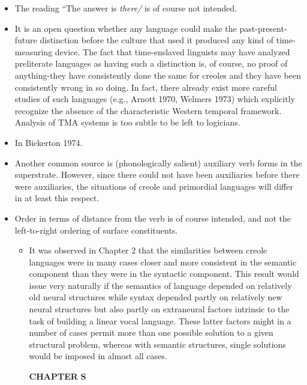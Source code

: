 \begin{itemize}
\begin{itemize}
\begin{itemize}
\begin{itemize}
\begin{itemize}
\begin{itemize}
\begin{itemize}
\begin{itemize}
\begin{itemize}
\begin{itemize}
\begin{itemize}
\begin{itemize}

\begin{itemize}
\item The reading ``The answer is \textit{ther}\textit{e}\textit{/{\textquotedbl}} is of course not intended.
\item It is an open question whether any language could make the past-present-future distinction before the culture that used it produced any kind of time-measuring device. The fact that time-enslaved linguists may have analyzed preliterate languages as having such a distinction is, of course, no proof of anything-they have consistently done the same for creoles and they have been consistently wrong in so doing. In fact, there already exist more careful studies of such languages (e.g., Arnott 1970, Welmers 1973) which explicitly recognize the absence of the characteristic Western temporal framework. Analysis of TMA systems is too subtle to be left to logicians.
\end{itemize}
\begin{itemize}
\item In Bickerton 1974.
\item Another common source is (phonologically salient) auxiliary verb forms in the superstrate. However, since there could not have been auxiliaries before there were auxiliaries, the situations of creole and primordial languages will differ in at least this respect.
\item Order in terms of distance from the verb is of course intended, and not the left-to-right ordering of surface constituents.

\begin{itemize}
\item It was observed in Chapter 2 that the similarities between creole languages were in many cases closer and more consistent in the semantic component than they were in the syntactic component. This result would issue very naturally if the semantics of language depended on relatively old neural structnres while syntax depended partly on relatively new neural structures but also partly on extraneural factors intrinsic to the task of building a linear vocal language. These latter factors might in a number of cases permit more than one possible solution to a given structural problem, whereas with semantic struc\-tures, single solutions would be imposed in almost all cases.

\textbf{CHAPTER} \textbf{S}


\end{itemize}
\end{itemize}
\end{itemize}
\end{itemize}
\end{itemize}
\end{itemize}
\end{itemize}
\end{itemize}
\end{itemize}
\end{itemize}
\end{itemize}
\end{itemize}
\end{itemize}
\end{itemize}
